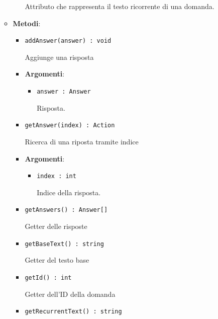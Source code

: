 \documentclass[../DefinizioneDiProdotto.tex]{subfiles}
\begin{document}
\begin{itemize}
\begin{itemize}
\begin{itemize}
	 Attributo che rappresenta il testo ricorrente di una domanda.
	\end{itemize}
	\item \textbf{Metodi}:
	\begin{itemize}
	\item \texttt{addAnswer(answer) : void}\

	 Aggiunge una risposta

	\item \textbf{Argomenti}:
	\begin{itemize}
	\item \texttt{answer : Answer}\

	 Risposta.
	\end{itemize}
	\end{itemize}\vspace{0.5em}
	\begin{itemize}
	\item \texttt{getAnswer(index) : Action}\

	 Ricerca di una riposta tramite indice

	\item \textbf{Argomenti}:
	\begin{itemize}
	\item \texttt{index : int}\

	 Indice della risposta.
	\end{itemize}
	\end{itemize}\vspace{0.5em}
	\begin{itemize}
	\item \texttt{getAnswers() : Answer[]}\

	 Getter delle risposte
	\end{itemize}\vspace{0.5em}
	\begin{itemize}
	\item \texttt{getBaseText() : string}\

	 Getter del testo base
	\end{itemize}\vspace{0.5em}
	\begin{itemize}
	\item \texttt{getId() : int}\

	 Getter dell'ID della domanda
	\end{itemize}\vspace{0.5em}
	\begin{itemize}
	\item \texttt{getRecurrentText() : string}\


\end{itemize}
\end{itemize}
\end{itemize}
\end{document}
